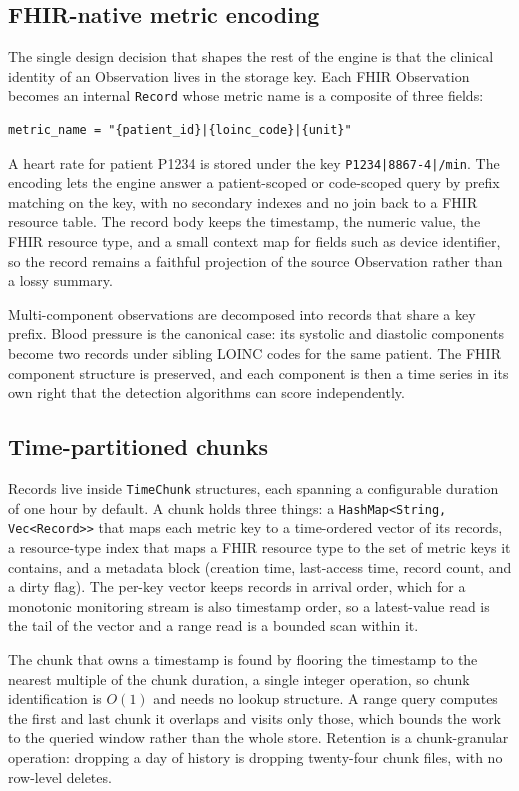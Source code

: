 \documentclass[journal]{IEEEtran}
\begin{document}
\subsection{FHIR-native metric encoding}
The single design decision that shapes the rest of the engine is that the clinical identity of an Observation lives in the storage key. Each FHIR Observation becomes an internal \texttt{Record} whose metric name is a composite of three fields:
\begin{lstlisting}
metric_name = "{patient_id}|{loinc_code}|{unit}"
\end{lstlisting}
A heart rate for patient P1234 is stored under the key \texttt{P1234|8867-4|/min}. The encoding lets the engine answer a patient-scoped or code-scoped query by prefix matching on the key, with no secondary indexes and no join back to a FHIR resource table. The record body keeps the timestamp, the numeric value, the FHIR resource type, and a small context map for fields such as device identifier, so the record remains a faithful projection of the source Observation rather than a lossy summary.

Multi-component observations are decomposed into records that share a key prefix. Blood pressure is the canonical case: its systolic and diastolic components become two records under sibling LOINC codes for the same patient. The FHIR component structure is preserved, and each component is then a time series in its own right that the detection algorithms can score independently.

\subsection{Time-partitioned chunks}
Records live inside \texttt{TimeChunk} structures, each spanning a configurable duration of one hour by default. A chunk holds three things: a \texttt{HashMap<String, Vec<Record>{}>} that maps each metric key to a time-ordered vector of its records, a resource-type index that maps a FHIR resource type to the set of metric keys it contains, and a metadata block (creation time, last-access time, record count, and a dirty flag). The per-key vector keeps records in arrival order, which for a monotonic monitoring stream is also timestamp order, so a latest-value read is the tail of the vector and a range read is a bounded scan within it.

The chunk that owns a timestamp is found by flooring the timestamp to the nearest multiple of the chunk duration, a single integer operation, so chunk identification is $O(1)$ and needs no lookup structure. A range query computes the first and last chunk it overlaps and visits only those, which bounds the work to the queried window rather than the whole store. Retention is a chunk-granular operation: dropping a day of history is dropping twenty-four chunk files, with no row-level deletes.
\end{document}
